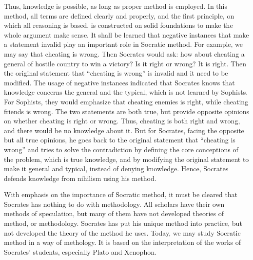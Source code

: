 \documentclass[11pt]{article}
\begin{document}
\begin{sloppypar}
Thus, knowledge is possible, as long as proper method is employed. 
In this method, all terms are defined clearly and properly, and the first principle, on which all reasoning is based, is constructed on solid foundations to make the whole argument make sense. 
It shall be learned that negative instances that make a statement invalid play an important role in Socratic method. 
For example, we may say that cheating is wrong. 
Then Socrates would ask: 
how about cheating a general of hostile country to win a victory? 
Is it right or wrong? 
It is right. 
Then the original statement that “cheating is wrong” is invalid and it need to be modified. 
The usage of negative instances indicated that Socrates knows that knowledge concerns the general and the typical, which is not learned by Sophists. 
For Sophists, they would emphasize that cheating enemies is right, while cheating friends is wrong. 
The two statements are both true, but provide opposite opinions on whether cheating is right or wrong. 
Thus, cheating is both right and wrong, and there would be no knowledge about it. 
But for Socrates, facing the opposite but all true opinions, he goes back to the original statement that “cheating is wrong” and tries to solve the contradiction by defining the core conceptions of the problem, which is true knowledge, and by modifying the original statement to make it general and typical, instead of denying knowledge. 
Hence, Socrates defends knowledge from nihilism using his method.

\par

With emphasis on the importance of Socratic method, it must be cleared that Socrates has nothing to do with methodology. 
All scholars have their own methods of speculation, but many of them have not developed theories of method, or methodology. 
Socrates has put his unique method into practice, but not developed the theory of the method he uses. 
Today, we may study Socratic method in a way of methology. 
It is based on the interpretation of the works of Socrates’ students, especially Plato and Xenophon.

\par


\end{sloppypar}
\end{document}
